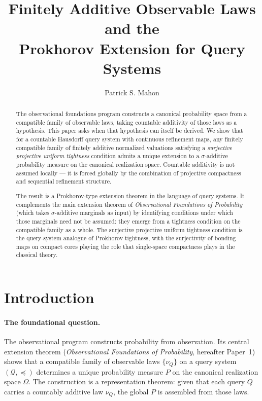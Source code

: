 \documentclass[11pt]{article}
\title{
Finitely Additive Observable Laws and the\\
Prokhorov Extension for Query Systems
}
\author{Patrick S. Mahon}
\date{}
\theoremstyle{definition}
\newcommand{\Qcal}{\mathcal{Q}}
\begin{document}
\maketitle

\begin{abstract}
The observational foundations program constructs a canonical probability
space from a compatible family of observable laws, taking countable
additivity of those laws as a hypothesis.  This paper asks when that
hypothesis can itself be derived.  We show that for a countable
Hausdorff query system with continuous refinement maps, any finitely
compatible family of finitely additive normalized valuations satisfying
a \emph{surjective projective uniform tightness} condition admits a
unique extension to a $\sigma$-additive probability measure on the
canonical realization space.  Countable additivity is not assumed
locally --- it is forced globally by the combination of projective
compactness and sequential refinement structure.

The result is a Prokhorov-type extension theorem in the language of
query systems.  It complements the main extension theorem of
\emph{Observational Foundations of Probability} (which takes
$\sigma$-additive marginals as input) by identifying conditions under
which those marginals need not be assumed: they emerge from a tightness
condition on the compatible family as a whole.  The surjective
projective uniform tightness condition is the query-system analogue of
Prokhorov tightness, with the surjectivity of bonding maps on compact
cores playing the role that single-space compactness plays in the
classical theory.
\end{abstract}

\section{Introduction}

\paragraph{The foundational question.}
The observational program constructs probability from observation.
Its central extension theorem (\emph{Observational Foundations of
Probability}, hereafter Paper~1) shows that a compatible family of
observable laws $\{\nu_Q\}$ on a query system $(\Qcal, \preceq)$
determines a unique probability measure $P$ on the canonical
realization space $\Omega$.  The construction is a representation
theorem: given that each query $Q$ carries a countably additive law
$\nu_Q$, the global $P$ is assembled from those laws.
\end{document}
